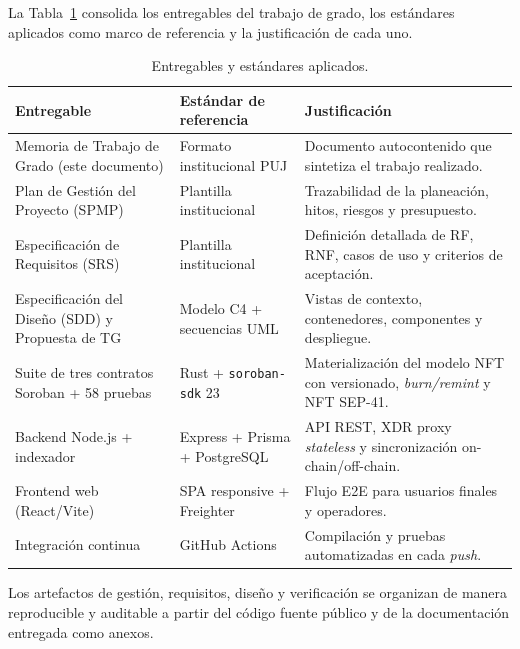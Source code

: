 La Tabla~\ref{tab:entregables} consolida los entregables del trabajo de grado, los estándares aplicados como marco de referencia y la justificación de cada uno.

\begin{table}[H]
\centering
\small
\caption{Entregables y estándares aplicados.}
\label{tab:entregables}
\begin{tabular}{p{3.8cm}p{4.2cm}p{6.0cm}}
\toprule
\textbf{Entregable} & \textbf{Estándar de referencia} & \textbf{Justificación} \\
\midrule
Memoria de Trabajo de Grado (este documento) & Formato institucional PUJ & Documento autocontenido que sintetiza el trabajo realizado. \\
Plan de Gestión del Proyecto (SPMP) & Plantilla institucional & Trazabilidad de la planeación, hitos, riesgos y presupuesto. \\
Especificación de Requisitos (SRS) & Plantilla institucional & Definición detallada de RF, RNF, casos de uso y criterios de aceptación. \\
Especificación del Diseño (SDD) y Propuesta de TG & Modelo C4 + secuencias UML & Vistas de contexto, contenedores, componentes y despliegue. \\
Suite de tres contratos Soroban + 58 pruebas & Rust + \texttt{soroban-sdk} 23 & Materialización del modelo NFT con versionado, \textit{burn/remint} y NFT SEP-41. \\
Backend Node.js + indexador & Express + Prisma + PostgreSQL & API REST, XDR proxy \textit{stateless} y sincronización on-chain/off-chain. \\
Frontend web (React/Vite) & SPA responsive + Freighter & Flujo E2E para usuarios finales y operadores. \\
Integración continua & GitHub Actions & Compilación y pruebas automatizadas en cada \textit{push}. \\
\bottomrule
\end{tabular}
\end{table}

Los artefactos de gestión, requisitos, diseño y verificación se organizan de manera reproducible y auditable a partir del código fuente público y de la documentación entregada como anexos.
